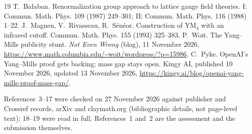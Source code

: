 \documentclass[11pt,a4paper]{article}
\theoremstyle{plain}
\begin{document}
\begin{thebibliography}{19}
 T.~Ba{\l}aban. Renormalization group approach to lattice gauge field theories. I: Commun. Math. Phys. 109 (1987) 249--301; II: Commun. Math. Phys. 116 (1988) 1--22.
 J.~Magnen, V.~Rivasseau, R.~S\'en\'eor. Construction of YM$_4$ with an infrared cutoff. Commun. Math. Phys. 155 (1993) 325--383.
 P.~Woit. The Yang--Mills publicity stunt. \emph{Not Even Wrong} (blog), 11 November 2026, \url{https://www.math.columbia.edu/~woit/wordpress/?p=15986}.
 C.~Pyke. OpenAI's Yang--Mills proof gets backing; mass gap stays open. Kingy AI, published 10 November 2026, updated 13 November 2026, \url{https://kingy.ai/blog/openai-yang-mills-proof-mass-gap/}.
\end{thebibliography}

\noindent\small References~3--17 were checked on 27 November 2026 against publisher and Crossref records, arXiv and claymath.org (bibliographic details, not page-level text); 18--19 were read in full. References~1 and~2 are the assessment and the submission themselves.
\end{document}
